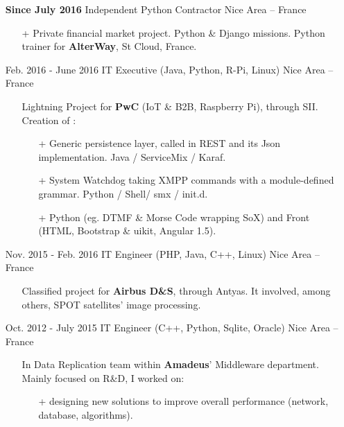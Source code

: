 \documentclass{res}
\begin{document}
\begin{resume}
\begin{itemize}
\begin{itemize}
\begin{itemize}
						\end{itemize}
					\end{itemize}
					\item[] \textbf{Since July 2016} \tabto{5cm} Independent Python Contractor \hfill Nice Area -- France
					\begin{itemize}
						\item[+] Private financial market project. Python \& Django missions. Python trainer for \textbf{AlterWay}, St Cloud, France.
					\end{itemize}
					\item[] Feb. 2016 - June 2016 \tabto{5cm} IT Executive (Java, Python, R-Pi, Linux) \hfill Nice Area -- France
					\begin{itemize}
						\item[] Lightning Project for \textbf{PwC} (IoT \& B2B, Raspberry Pi), through SII. Creation of :
						\begin{itemize}
							\item[+] Generic persistence layer, called in REST and its Json implementation. Java / ServiceMix / Karaf.
							\item[+] System Watchdog taking XMPP commands with a module-defined grammar. Python / Shell/ smx / init.d.
							\item[+] Python (eg. DTMF \& Morse Code wrapping SoX) and Front (HTML, Bootstrap \& uikit, Angular 1.5).
						\end{itemize}
					\end{itemize}
								\item[] Nov. 2015 - Feb. 2016 \tabto{5cm} IT Engineer (PHP, Java, C++, Linux) \hfill Nice Area -- France
												\begin{itemize}
																\item[] Classified project for \textbf{Airbus D\&S}, through Antyas. It involved, among others, SPOT satellites' image processing.
												\end{itemize}
                \item[] Oct. 2012 - July 2015 \tabto{5cm} IT Engineer (C++, Python, Sqlite, Oracle) \hfill Nice Area -- France
                \begin{itemize}
                        \item[] In Data Replication team within \textbf{Amadeus}' Middleware department. Mainly focused on R\&D, I worked on:
                        \begin{itemize}
                                \item[+] designing new solutions to improve overall performance (network, database, algorithms).

\end{itemize}
\end{itemize}
\end{itemize}
\end{resume}
\end{document}
